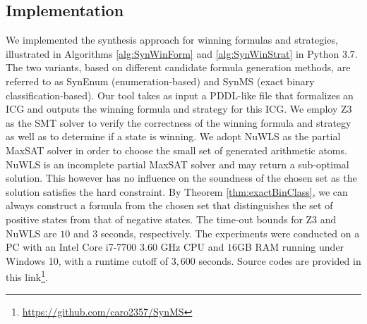 \documentclass[review]{elsarticle}
\begin{document}
\subsection{Implementation}
We implemented the synthesis approach for winning formulas and strategies, illustrated in Algorithms \ref{alg:SynWinForm} and \ref{alg:SynWinStrat} in Python 3.7.
The two variants, based on different candidate formula generation methods, are referred to as SynEnum (enumeration-based) and SynMS (exact binary classification-based).
Our tool takes as input a PDDL-like file that formalizes an ICG and outputs the winning formula and strategy for this ICG.
We employ Z3 \cite{MouB2008} as the SMT solver to verify the correctness of the winning formula and strategy as well as to determine if a state is winning.
We adopt NuWLS \cite{ChuCL2023} as the partial MaxSAT solver in order to choose the small set of generated arithmetic atoms.
NuWLS is an incomplete partial MaxSAT solver and may return a sub-optimal solution.
This however has no influence on the soundness of the chosen set as the solution satisfies the hard constraint.
By Theorem \ref{thm:exactBinClass}, we can always construct a formula from the chosen set that distinguishes the set of positive states from that of negative states.
The time-out bounds for Z3 and NuWLS are $10$ and $3$ seconds, respectively.
The experiments were conducted on a PC with an Intel Core i7-7700 $3.60$ GHz CPU and $16$GB RAM running under Windows 10, with a runtime cutoff of $3,600$ seconds.
Source codes are provided in this link\footnote{\url{https://github.com/caro2357/SynMS}}.
\end{document}
